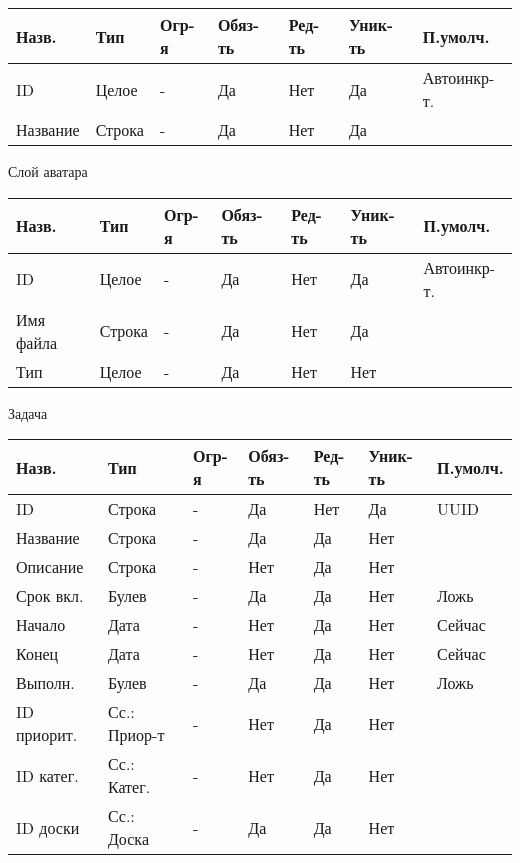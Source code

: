 \documentclass[../document.tex]{subfiles}
\begin{document}
\begin{tabular}{ | l | l | l | l | l | l | l | }
  \hline
  Назв.    & Тип    & Огр-я & Обяз-ть & Ред-ть & Уник-ть & П.умолч.    \\
  \hline
  ID       & Целое  & -     & Да      & Нет    & Да      & Автоинкр-т. \\
  Название & Строка & -     & Да      & Нет    & Да      &             \\
  \hline
\end{tabular}

Слой аватара

\begin{tabular}{ | l | l | l | l | l | l | l | }
  \hline
  Назв.     & Тип    & Огр-я & Обяз-ть & Ред-ть & Уник-ть & П.умолч.    \\
  \hline
  ID        & Целое  & -     & Да      & Нет    & Да      & Автоинкр-т. \\
  Имя файла & Строка & -     & Да      & Нет    & Да      &             \\
  Тип       & Целое  & -     & Да      & Нет    & Нет     &             \\
  \hline
\end{tabular}

Задача

\begin{tabular}{ | l | l | l | l | l | l | l | }
  \hline
  Назв.       & Тип          & Огр-я & Обяз-ть & Ред-ть & Уник-ть & П.умолч. \\
  \hline
  ID          & Строка       & -     & Да      & Нет    & Да      & UUID     \\
  Название    & Строка       & -     & Да      & Да     & Нет     &          \\
  Описание    & Строка       & -     & Нет     & Да     & Нет     &          \\
  Срок вкл.   & Булев        & -     & Да      & Да     & Нет     & Ложь     \\
  Начало      & Дата         & -     & Нет     & Да     & Нет     & Сейчас   \\
  Конец       & Дата         & -     & Нет     & Да     & Нет     & Сейчас   \\
  Выполн.     & Булев        & -     & Да      & Да     & Нет     & Ложь     \\
  ID приорит. & Сс.: Приор-т & -     & Нет     & Да     & Нет     &          \\
  ID катег.   & Сс.: Катег.  & -     & Нет     & Да     & Нет     &          \\
  ID доски    & Сс.: Доска   & -     & Да      & Да     & Нет     &          \\
  \hline
\end{tabular}
\end{document}
